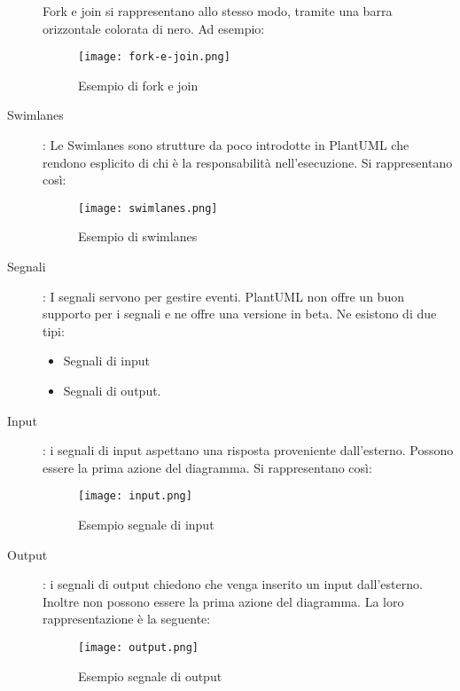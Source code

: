 \documentclass[../../norme-di-progetto.tex]{subfiles}
\begin{document}
\begin{description}
        Fork e join si rappresentano allo stesso modo, tramite una barra orizzontale colorata di nero. Ad esempio:
        \begin{figure}[H]%
          \label{fig:fork_e_join}
          \texttt{[image: fork-e-join.png]}
          \centering
          \caption{Esempio di fork e join}
        \end{figure}
  \item[Swimlanes]: Le Swimlanes sono strutture da poco introdotte in PlantUML che rendono esplicito di chi è la responsabilità nell'esecuzione. Si rappresentano così:
        \begin{figure}[H]%
          \label{fig:swimlanes}
          \texttt{[image: swimlanes.png]}
          \centering
          \caption{Esempio di swimlanes}
        \end{figure}
  \item[Segnali]: I segnali servono per gestire eventi.
        PlantUML non offre un buon supporto per i segnali e ne offre una versione in beta.
        Ne esistono di due tipi:
        \begin{itemize}
          \item Segnali di input
          \item Segnali di output.
        \end{itemize}
  \item [Input]: i segnali di input aspettano una risposta proveniente dall'esterno.
        Possono essere la prima azione del diagramma.
        Si rappresentano così:
        \begin{figure}[H]%
          \label{fig:input}
          \texttt{[image: input.png]}
          \centering
          \caption{Esempio segnale di input}
        \end{figure}
  \item [Output]: i segnali di output chiedono che venga inserito un input dall'esterno.
        Inoltre non possono essere la prima azione del diagramma.
        La loro rappresentazione è la seguente:
        \begin{figure}[H]%
          \label{fig:segnale_di_output}
          \texttt{[image: output.png]}
          \centering
          \caption{Esempio segnale di output}
        \end{figure}
\end{description}
\end{document}
